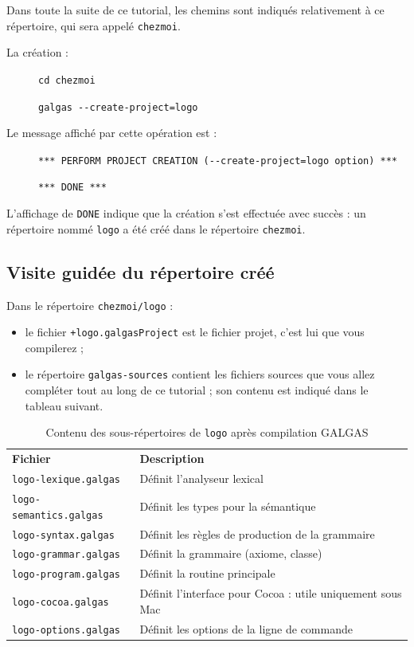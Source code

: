 Dans toute la suite de ce tutorial, les chemins sont indiqués relativement à ce répertoire, qui sera appelé \texttt{chezmoi}.

La création :
\begin{description}
  \item[ ] \texttt{cd chezmoi}
  \item[ ] \texttt{galgas -{}-create-project=logo}
\end{description}

Le message affiché par cette opération est :
\begin{description}
  \item[ ] \texttt{*** PERFORM PROJECT CREATION (-{}-create-project=logo option) ***}
  \item[ ] \texttt{*** DONE ***}
\end{description}

L’affichage de \texttt{DONE} indique que la création s’est effectuée avec succès : un répertoire nommé \texttt{logo} a été créé dans le répertoire \texttt{chezmoi}.

\subsection{Visite guidée du répertoire créé}

Dans le répertoire \texttt{chezmoi/logo} :
\begin{itemize}
  \item le fichier \texttt{+logo.galgasProject} est le fichier projet, c’est lui que vous compilerez ;
  \item le répertoire \texttt{galgas-sources} contient les fichiers sources que vous allez compléter tout au long de ce tutorial ; son contenu est indiqué dans le tableau suivant.
\end{itemize}

\begin{table}[t]
  \centering
  \begin{tabular}{ll}
    \textbf{Fichier} & \textbf{Description}\\
    \texttt{logo-lexique.galgas} & Définit l'analyseur lexical\\
    \texttt{logo-semantics.galgas} & Définit les types pour la sémantique\\
    \texttt{logo-syntax.galgas} & Définit les règles de production de la grammaire \\
    \texttt{logo-grammar.galgas} & Définit la grammaire (axiome, classe) \\
    \texttt{logo-program.galgas} & Définit la routine principale \\
    \texttt{logo-cocoa.galgas} & Définit l’interface pour Cocoa : utile uniquement sous Mac \\
    \texttt{logo-options.galgas} & Définit les options de la ligne de commande \\
  \end{tabular}
  \caption{Contenu des sous-répertoires de \texttt{logo} après compilation GALGAS}
  \ligne
\end{table}






